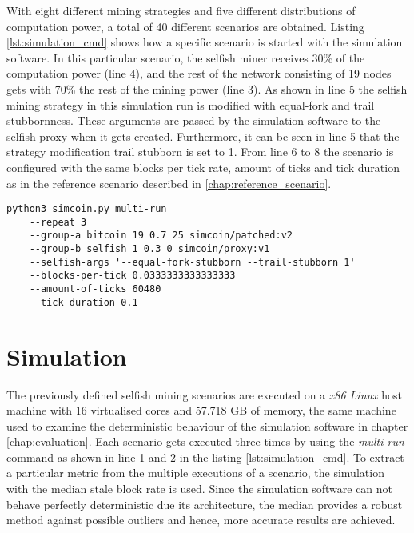 With eight different mining strategies and five different distributions of computation power, a total of 40 different scenarios are obtained.
Listing \ref{lst:simulation_cmd} shows how a specific scenario is started with the simulation software.
In this particular scenario, the selfish miner receives 30\% of the computation power (line 4), and the rest of the network consisting of 19 nodes gets with 70\% the rest of the mining power (line 3).
As shown in line 5 the selfish mining strategy in this simulation run is modified with equal-fork and trail stubbornness.
These arguments are passed by the simulation software to the selfish proxy when it gets created.
Furthermore, it can be seen in line 5 that the strategy modification trail stubborn is set to 1.
From line 6 to 8 the scenario is configured with the same blocks per tick rate, amount of ticks and tick duration as in the reference scenario described in \ref{chap:reference_scenario}.

\begin{minipage}{\linewidth}
\begin{lstlisting}[caption=Command to execute a particular selfish mining scenario, label={lst:simulation_cmd}, basicstyle=\ttfamily, captionpos=b]
python3 simcoin.py multi-run 
	--repeat 3 
	--group-a bitcoin 19 0.7 25 simcoin/patched:v2 
	--group-b selfish 1 0.3 0 simcoin/proxy:v1 
	--selfish-args '--equal-fork-stubborn --trail-stubborn 1' 
	--blocks-per-tick 0.0333333333333333 
	--amount-of-ticks 60480 
	--tick-duration 0.1
\end{lstlisting}
\end{minipage}

\section{Simulation}

The previously defined selfish mining scenarios are executed on a \textit{x86 Linux} host machine with 16 virtualised cores and 57.718 GB of memory, the same machine used to examine the deterministic behaviour of the simulation software in chapter \ref{chap:evaluation}.
Each scenario gets executed three times by using the \textit{multi-run} command as shown in line 1 and 2 in the listing \ref{lst:simulation_cmd}.
To extract a particular metric from the multiple executions of a scenario, the simulation with the median stale block rate is used.
Since the simulation software can not behave perfectly deterministic due its architecture, the median provides a robust method against possible outliers and hence, more accurate results are achieved.

